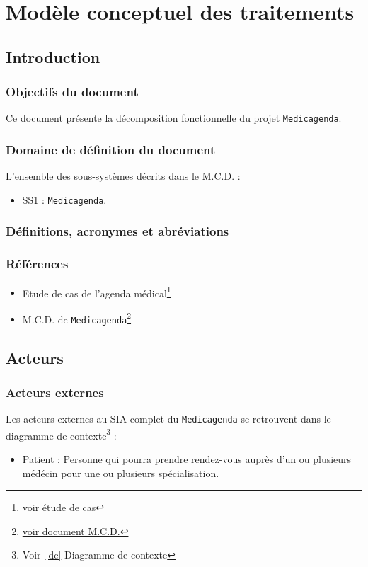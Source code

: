\documentclass[a4paper, 11pt]{report}
\begin{document}

\tableofcontents

\chapter{Modèle conceptuel des traitements}

\section{Introduction}

\subsection{Objectifs du document}
Ce document présente la décomposition fonctionnelle du projet \texttt{Medicagenda}.
\subsection{Domaine de définition du document}
L'ensemble des sous-systèmes décrits dans le M.C.D. :
\begin{itemize}
	\item SS1 : \texttt{Medicagenda}.
\end{itemize}
\subsection{Définitions, acronymes et abréviations}
\subsection{Références}
\begin{itemize}
	\item[] Etude de cas de l'agenda médical\footnote{\href{../analyse.pdf}{voir
		étude de cas}}
	\item[] M.C.D. de \texttt{Medicagenda}\footnote{\href{../M.C.D..M.C.D..pdf}{voir document M.C.D.}}
\end{itemize}
\newpage
\section{Acteurs}
\subsection{Acteurs externes}
Les acteurs externes au SIA complet du \texttt{Medicagenda} se retrouvent dans le 
diagramme de contexte\footnote{Voir~\ref{dc} Diagramme de contexte} : 
\begin{itemize}
	\item Patient : Personne qui pourra prendre rendez-vous auprès d'un ou
		plusieurs médécin pour une ou plusieurs spécialisation.
\end{itemize}
\end{document}
